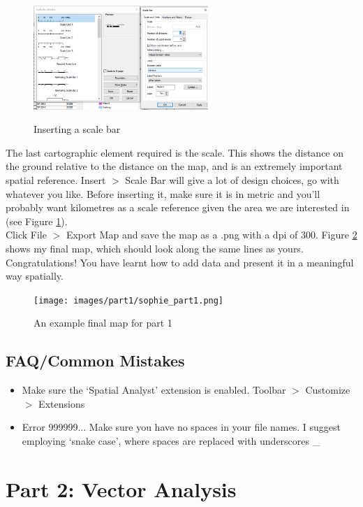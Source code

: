 \documentclass{article}
\begin{document}
\begin{figure}[h]
    \centering
    \caption{Inserting a scale bar}
    \includegraphics[width=250px]{images/part1/layout_scalebar.PNG}
    \label{layout_scalebar}
\end{figure}

The last cartographic element required is the scale. This shows the distance on the ground relative to the distance on the map, and is an extremely important spatial reference. Insert $>$ Scale Bar will give a lot of design choices, go with whatever you like. Before inserting it, make sure it is in metric and you'll probably want kilometres as a scale reference given the area we are interested in (see Figure \ref{layout_scalebar}).\\

Click File $>$ Export Map and save the map as a .png with a dpi of 300. Figure \ref{example_part1} shows my final map, which should look along the same lines as yours. Congratulations! You have learnt how to add data and present it in a meaningful way spatially.

\begin{figure}[h]
    \centering
    \caption{An example final map for part 1}
    \texttt{[image: images/part1/sophie\_part1.png]}
    \label{example_part1}
\end{figure}

\subsection{FAQ/Common Mistakes}
\begin{itemize}
    \item Make sure the `Spatial Analyst' extension is enabled. Toolbar $>$ Customize $>$ Extensions
    \item Error 999999... Make sure you have no spaces in your file names. I suggest employing `snake case', where spaces are replaced with underscores \_
\end{itemize}

\pagebreak

\section{Part 2: Vector Analysis}
\end{document}
